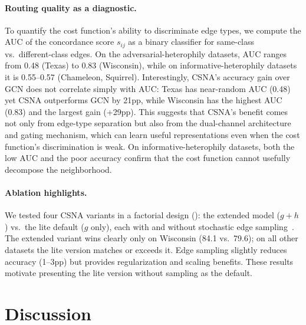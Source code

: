 \documentclass[runningheads]{llncs}
\begin{document}
\paragraph{Routing quality as a diagnostic.}
To quantify the cost function's ability to discriminate edge types, we compute the AUC of the concordance score $s_{ij}$ as a binary classifier for same-class vs.\ different-class edges.
On the adversarial-heterophily datasets, AUC ranges from 0.48 (Texas) to 0.83 (Wisconsin), while on informative-heterophily datasets it is 0.55--0.57 (Chameleon, Squirrel).
Interestingly, CSNA's accuracy gain over GCN does not correlate simply with AUC: Texas has near-random AUC (0.48) yet CSNA outperforms GCN by 21pp, while Wisconsin has the highest AUC (0.83) and the largest gain (+29pp).
This suggests that CSNA's benefit comes not only from edge-type separation but also from the dual-channel architecture and gating mechanism, which can learn useful representations even when the cost function's discrimination is weak.
On informative-heterophily datasets, both the low AUC and the poor accuracy confirm that the cost function cannot usefully decompose the neighborhood.

\paragraph{Ablation highlights.}
We tested four CSNA variants in a factorial design (): the extended model ($g+h$) vs.\ the lite default ($g$ only), each with and without stochastic edge sampling~\cite{rong2020dropedge}.
The extended variant wins clearly only on Wisconsin (84.1 vs.\ 79.6); on all other datasets the lite version matches or exceeds it.
Edge sampling slightly reduces accuracy (1--3pp) but provides regularization and scaling benefits.
These results motivate presenting the lite version without sampling as the default.


\section{Discussion}\label{sec:discussion}
\end{document}
